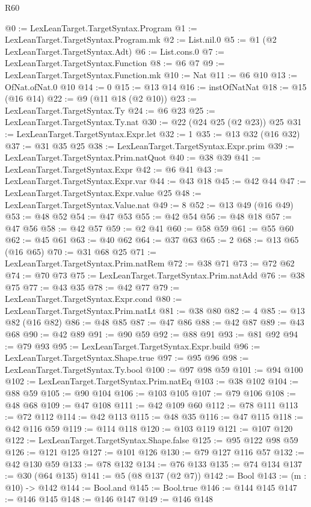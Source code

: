 \begin{lexlean}{R60}
\begin{coremodule}
@0 := LexLeanTarget.TargetSyntax.Program
@1 := LexLeanTarget.TargetSyntax.Program.mk
@2 := List.nil.{0}
@5 := @1 (@2 LexLeanTarget.TargetSyntax.Adt)
@6 := List.cons.{0}
@7 := LexLeanTarget.TargetSyntax.Function
@8 := @6 @7
@9 := LexLeanTarget.TargetSyntax.Function.mk
@10 := Nat
@11 := @6 @10
@13 := OfNat.ofNat.{0} @10
@14 := 0
@15 := @13 @14
@16 := instOfNatNat
@18 := @15 (@16 @14)
@22 := @9 (@11 @18 (@2 @10))
@23 := LexLeanTarget.TargetSyntax.Ty
@24 := @6 @23
@25 := LexLeanTarget.TargetSyntax.Ty.nat
@30 := @22 (@24 @25 (@2 @23)) @25
@31 := LexLeanTarget.TargetSyntax.Expr.let
@32 := 1
@35 := @13 @32 (@16 @32)
@37 := @31 @35 @25
@38 := LexLeanTarget.TargetSyntax.Expr.prim
@39 := LexLeanTarget.TargetSyntax.Prim.natQuot
@40 := @38 @39
@41 := LexLeanTarget.TargetSyntax.Expr
@42 := @6 @41
@43 := LexLeanTarget.TargetSyntax.Expr.var
@44 := @43 @18
@45 := @42 @44
@47 := LexLeanTarget.TargetSyntax.Expr.value @25
@48 := LexLeanTarget.TargetSyntax.Value.nat
@49 := 8
@52 := @13 @49 (@16 @49)
@53 := @48 @52
@54 := @47 @53
@55 := @42 @54
@56 := @48 @18
@57 := @47 @56
@58 := @42 @57
@59 := @2 @41
@60 := @58 @59
@61 := @55 @60
@62 := @45 @61
@63 := @40 @62
@64 := @37 @63
@65 := 2
@68 := @13 @65 (@16 @65)
@70 := @31 @68 @25
@71 := LexLeanTarget.TargetSyntax.Prim.natRem
@72 := @38 @71
@73 := @72 @62
@74 := @70 @73
@75 := LexLeanTarget.TargetSyntax.Prim.natAdd
@76 := @38 @75
@77 := @43 @35
@78 := @42 @77
@79 := LexLeanTarget.TargetSyntax.Expr.cond
@80 := LexLeanTarget.TargetSyntax.Prim.natLt
@81 := @38 @80
@82 := 4
@85 := @13 @82 (@16 @82)
@86 := @48 @85
@87 := @47 @86
@88 := @42 @87
@89 := @43 @68
@90 := @42 @89
@91 := @90 @59
@92 := @88 @91
@93 := @81 @92
@94 := @79 @93
@95 := LexLeanTarget.TargetSyntax.Expr.build
@96 := LexLeanTarget.TargetSyntax.Shape.true
@97 := @95 @96
@98 := LexLeanTarget.TargetSyntax.Ty.bool
@100 := @97 @98 @59
@101 := @94 @100
@102 := LexLeanTarget.TargetSyntax.Prim.natEq
@103 := @38 @102
@104 := @88 @59
@105 := @90 @104
@106 := @103 @105
@107 := @79 @106
@108 := @48 @68
@109 := @47 @108
@111 := @42 @109 @60
@112 := @78 @111
@113 := @72 @112
@114 := @42 @113
@115 := @48 @35
@116 := @47 @115
@118 := @42 @116 @59
@119 := @114 @118
@120 := @103 @119
@121 := @107 @120
@122 := LexLeanTarget.TargetSyntax.Shape.false
@125 := @95 @122 @98 @59
@126 := @121 @125
@127 := @101 @126
@130 := @79 @127 @116 @57
@132 := @42 @130 @59
@133 := @78 @132
@134 := @76 @133
@135 := @74 @134
@137 := @30 (@64 @135)
@141 := @5 (@8 @137 (@2 @7))
@142 := Bool
@143 := (m : @10) -> @142
@144 := Bool.and
@145 := Bool.true
@146 := @144 @145
@147 := @146 @145
@148 := @146 @147
@149 := @146 @148

\end{coremodule}
\end{lexlean}
